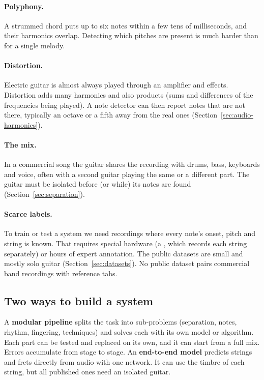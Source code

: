 \paragraph{Polyphony.} A strummed chord puts up to six notes within a few tens
of milliseconds, and their harmonics overlap. Detecting which pitches are
present is much harder than for a single melody.

\paragraph{Distortion.} Electric guitar is almost always played through an
amplifier and effects. Distortion adds many harmonics and also
 products (sums and differences of the frequencies being
played). A note detector can then report notes that are not there, typically an
octave or a fifth away from the real ones (Section~\ref{sec:audio-harmonics}).

\paragraph{The mix.} In a commercial song the guitar shares the recording with
drums, bass, keyboards and voice, often with a second guitar playing the same
or a different part. The guitar must be isolated before (or while) its notes
are found (Section~\ref{sec:separation}).

\paragraph{Scarce labels.} To train or test a system we need recordings where
every note's onset, pitch and string is known. That requires special hardware
(a , which records each string separately) or hours of
expert annotation. The public datasets are small and mostly solo guitar
(Section~\ref{sec:datasets}). No public dataset pairs commercial band
recordings with reference tabs.

\subsection{Two ways to build a system}

\begin{keyidea}
A \textbf{modular pipeline} splits the task into sub-problems (separation,
notes, rhythm, fingering, techniques) and solves each with its own model or
algorithm. Each part can be tested and replaced on its own, and it can start
from a full mix. Errors accumulate from stage to stage. An \textbf{end-to-end
model} predicts strings and frets directly from audio with one network. It can
use the timbre of each string, but all published ones need an isolated guitar.
\end{keyidea}

